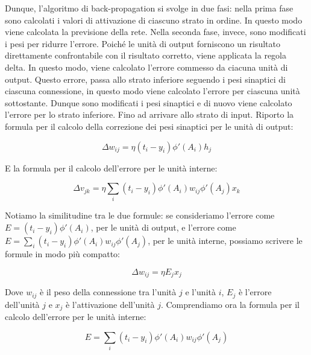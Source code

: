 Dunque, l'algoritmo di back-propagation si svolge in due fasi: nella prima fase
sono calcolati i valori di attivazione di ciascuno strato in ordine. In questo
modo viene calcolata la previsione della rete. Nella seconda fase, invece, sono
modificati i pesi per ridurre l'errore. Poiché le unità di output forniscono un
risultato direttamente confrontabile con il risultato corretto, viene applicata
la regola delta. In questo modo, viene calcolato l'errore commesso da ciacuna
unità di output. Questo errore, passa allo strato inferiore seguendo i pesi
sinaptici di ciascuna connessione, in questo modo viene calcolato l'errore per
ciascuna unità sottostante. Dunque sono modificati i pesi sinaptici e di nuovo
viene calcolato l'errore per lo strato inferiore. Fino ad arrivare allo strato
di input.
Riporto la formula per il calcolo della correzione dei pesi sinaptici per le
unità di output:

\begin{equation*}
	\Delta w_{ij} = \eta (t_i - y_i) \phi'(A_i) h_j
\end{equation*}

E la formula per il calcolo dell'errore per le unità interne:

\begin{equation*}
	\Delta v_{jk} = \eta \sum_{i} (t_i - y_i) \phi'(A_i) w_{ij} \phi'(A_j) x_k
\end{equation*}

Notiamo la similitudine tra le due formule: se consideriamo l'errore
come $E = (t_i - y_i) \phi'(A_i)$, per le unità di output, e l'errore come
$E = \sum_{i} (t_i - y_i) \phi'(A_i) w_{ij} \phi'(A_j)$, per le unità interne,
possiamo scrivere le formule in modo più compatto:

\begin{equation*}
	\Delta w_{ij} = \eta E_j x_j
\end{equation*}

Dove $w_{ij}$ è il peso della connessione tra l'unità $j$ e l'unità $i$, $E_j$
è l'errore dell'unità $j$ e $x_j$ è l'attivazione dell'unità $j$.
Comprendiamo ora la formula per il calcolo dell'errore per le unità interne:

\begin{equation*}
	E = \sum_{i} (t_i - y_i) \phi'(A_i) w_{ij} \phi'(A_j)
\end{equation*}

